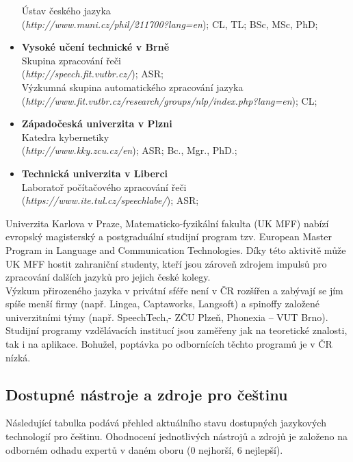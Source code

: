 \begin{multicols}{2}
\begin{itemize}
  Ústav českého jazyka\\ (\textit{http://www.muni.cz/phil/211700?lang=en}); CL, TL; BSc, MSc, PhD;
\item[] \textbf{Vysoké učení technické v Brně}\\
  Skupina zpracování řeči \\(\textit{http://speech.fit.vutbr.cz/}); ASR;\\ 
  Výzkumná skupina automatického zpracování jazyka \\(\textit{http://www.fit.vutbr.cz/research/groups/nlp/index.php?lang=en}); CL; 
\item[] \textbf{Západočeská univerzita v Plzni}\\
  Katedra kybernetiky\\ (\textit{http://www.kky.zcu.cz/en}); ASR; Bc., Mgr., PhD.;
\item[] \textbf{Technická univerzita v Liberci}\\
  Laboratoř počítačového zpracování řeči \\(\textit{https://www.ite.tul.cz/speechlabe/}); ASR; 
\end{itemize}

Univerzita Karlova v Praze, Matematicko-fyzikální fakulta (UK MFF) nabízí evropský magisterský a postgraduální studijní program tzv. European Master Program in Language and Communication Technologies. Díky této aktivitě může UK MFF hostit zahraniční studenty, kteří jsou zároveň zdrojem impulsů pro zpracování dalších jazyků pro jejich české kolegy.\\
Výzkum přirozeného jazyka v privátní sféře není v ČR rozšířen a zabývají se jím spíše menší firmy (např. Lingea, Captaworks, Langsoft) a spinoffy založené univerzitními týmy (např. SpeechTech,- ZČU Plzeň, Phonexia – VUT Brno).\\
Studijní programy vzdělávacích institucí jsou zaměřeny jak na teoretické znalosti, tak i na aplikace. Bohužel, poptávka po odbornících těchto programů je v ČR nízká.

\subsection{Dostupné nástroje a zdroje pro češtinu}
  
Následující tabulka podává přehled aktuálního stavu dostupných jazykových technologií pro češtinu. Ohodnocení jednotlivých nástrojů a zdrojů je založeno na odborném odhadu expertů v daném oboru (0 nejhorší, 6 nejlepší). 

\begin{figure}[htb]
\centering


\end{figure}
\end{multicols}
